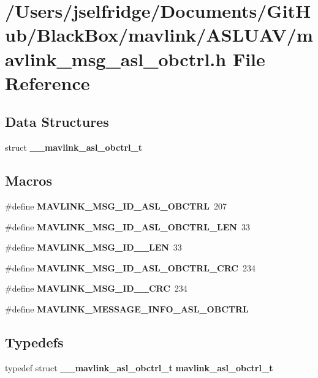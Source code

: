 \section{/\+Users/jselfridge/\+Documents/\+Git\+Hub/\+Black\+Box/mavlink/\+A\+S\+L\+U\+A\+V/mavlink\+\_\+msg\+\_\+asl\+\_\+obctrl.h File Reference}
\label{mavlink__msg__asl__obctrl_8h}
\subsection*{Data Structures}
\begin{DoxyCompactItemize}
\item 
struct \textbf{ \+\_\+\+\_\+mavlink\+\_\+asl\+\_\+obctrl\+\_\+t}
\end{DoxyCompactItemize}
\subsection*{Macros}
\begin{DoxyCompactItemize}
\item 
\#define \textbf{ M\+A\+V\+L\+I\+N\+K\+\_\+\+M\+S\+G\+\_\+\+I\+D\+\_\+\+A\+S\+L\+\_\+\+O\+B\+C\+T\+RL}~207
\item 
\#define \textbf{ M\+A\+V\+L\+I\+N\+K\+\_\+\+M\+S\+G\+\_\+\+I\+D\+\_\+\+A\+S\+L\+\_\+\+O\+B\+C\+T\+R\+L\+\_\+\+L\+EN}~33
\item 
\#define \textbf{ M\+A\+V\+L\+I\+N\+K\+\_\+\+M\+S\+G\+\_\+\+I\+D\+\_\+\_\+\+L\+EN}~33
\item 
\#define \textbf{ M\+A\+V\+L\+I\+N\+K\+\_\+\+M\+S\+G\+\_\+\+I\+D\+\_\+\+A\+S\+L\+\_\+\+O\+B\+C\+T\+R\+L\+\_\+\+C\+RC}~234
\item 
\#define \textbf{ M\+A\+V\+L\+I\+N\+K\+\_\+\+M\+S\+G\+\_\+\+I\+D\+\_\+\_\+\+C\+RC}~234
\item 
\#define \textbf{ M\+A\+V\+L\+I\+N\+K\+\_\+\+M\+E\+S\+S\+A\+G\+E\+\_\+\+I\+N\+F\+O\+\_\+\+A\+S\+L\+\_\+\+O\+B\+C\+T\+RL}
\end{DoxyCompactItemize}
\subsection*{Typedefs}
\begin{DoxyCompactItemize}
\item 
typedef struct \textbf{ \+\_\+\+\_\+mavlink\+\_\+asl\+\_\+obctrl\+\_\+t} \textbf{ mavlink\+\_\+asl\+\_\+obctrl\+\_\+t}
\end{DoxyCompactItemize}


